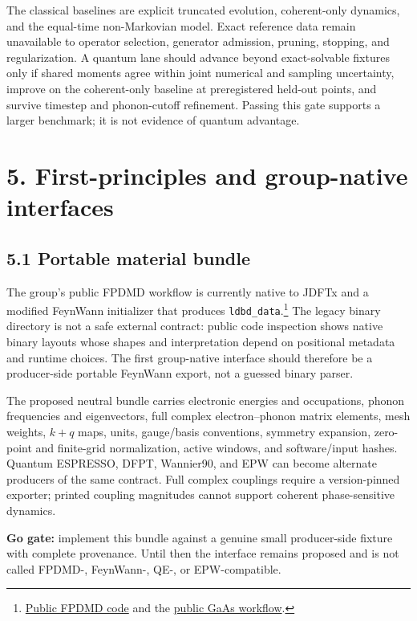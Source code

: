 \documentclass[11pt]{article}
\begin{document}
The classical baselines are explicit truncated evolution, coherent-only
dynamics, and the equal-time non-Markovian model. Exact reference data remain
unavailable to operator selection, generator admission, pruning, stopping, and
regularization. A quantum lane should advance beyond exact-solvable fixtures
only if shared moments agree within joint numerical and sampling uncertainty,
improve on the coherent-only baseline at preregistered held-out points, and
survive timestep and phonon-cutoff refinement. Passing this gate supports a
larger benchmark; it is not evidence of quantum advantage.

\section*{5. First-principles and group-native interfaces}

\subsection*{5.1 Portable material bundle}

The group's public FPDMD workflow is currently native to JDFTx and a modified
FeynWann initializer that produces \texttt{ldbd\_data}.\footnote{
\href{https://github.com/Ping-Group-UCSC/FPDMD_development}{Public FPDMD code}
and the
\href{https://github.com/Ping-Group-UCSC/Tutorials/blob/master/DMD-workflows/GaAs-DMD-example.md}{public GaAs workflow}.}
The legacy binary directory is not a safe external contract: public code
inspection shows native binary layouts whose shapes and interpretation depend
on positional metadata and runtime choices. The first group-native interface
should therefore be a producer-side portable FeynWann export, not a guessed
binary parser.

The proposed neutral bundle carries electronic energies and occupations,
phonon frequencies and eigenvectors, full complex electron--phonon matrix
elements, mesh weights, \(k+q\) maps, units, gauge/basis conventions, symmetry
expansion, zero-point and finite-grid normalization, active windows, and
software/input hashes. Quantum ESPRESSO, DFPT, Wannier90, and EPW can become
alternate producers of the same contract. Full complex couplings require a
version-pinned exporter; printed coupling magnitudes cannot support coherent
phase-sensitive dynamics.

\textbf{Go gate:} implement this bundle against a genuine small producer-side
fixture with complete provenance. Until then the interface remains proposed
and is not called FPDMD-, FeynWann-, QE-, or EPW-compatible.
\end{document}
